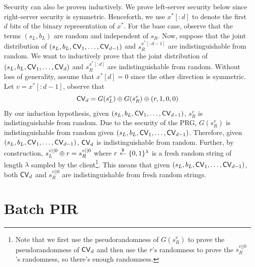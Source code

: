 
Security can also be proven inductively.
We prove left-server security below since right-server security is symmetric.
Henceforth, we use $x^*[:d]$ to denote the first $d$ bits of the
binary representation of $x^*$.
For the base case, observe that the terms $(s_L, b_L)$  are random
and independent of $s_R$. 
Now, suppose that 
the joint distribution of $(s_L, b_L, {\sf CV}_1, \ldots, {\sf CV}_{d-1})$
and  $s_R^{x^*[:d-1]}$ are indistinguishable from random. 
We want to inductively prove that 
the joint distribution of $(s_L, b_L, {\sf CV}_1, \ldots, {\sf CV}_d)$
and  $s_R^{x^*[:d]}$ are indistinguishable from random.
Without loss of generality, assume that $x^*[d] = 0$
since the other direction is symmetric.
Let $v = x^*[:d-1]$, observe
that 
\[\CV_d = 
G(s^v_L) \xor G(s^v_R) \xor  
(r, 1, 0, 0) %
\]
By our induction hypothesis, given $(s_L, b_L, {\sf CV}_1, \ldots, {\sf CV}_{d-1})$,
$s_R^v$ is indistinguishable from random.
Due to the security of the PRG, 
$G(s_R^v)$ 
is indistinguishable from random 
given $(s_L, b_L, {\sf CV}_1, \ldots, {\sf CV}_{d-1})$.
Therefore, given 
$(s_L, b_L, {\sf CV}_1, \ldots, {\sf CV}_{d-1})$,
${\sf CV}_d$ 
is indistinguishable from random.
Further, by construction, $s_L^{v||0} \oplus r = s_R^{v||0}$
where $r ~{\overset{\$}{\leftarrow}}~ \{0, 1\}^\lambda$ is a fresh random string
of length $\lambda$ sampled by the client\footnote{
Note that we first use the pseudorandomness of $G(s_R^v)$ to prove the pseudorandomness of ${\sf CV}_d$ and then use the $r$'s randomness to prove the $s_R^{v||0}$'s randomness, so there's enough randomness.}.
This means that 
given $(s_L, b_L, {\sf CV}_1, \ldots, {\sf CV}_{d-1})$, 
both ${\sf CV}_d$ and $s_R^{v||0}$
are indistinguishable from fresh random strings.





 \section{Batch PIR}


